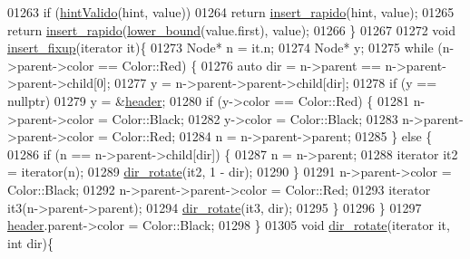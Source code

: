 \begin{DoxyCode}
01263         \textcolor{keywordflow}{if} (\hyperlink{classaed2_1_1map_a45b04533e9acf27438813ab4a2604443_a45b04533e9acf27438813ab4a2604443}{hintValido}(hint, value))
01264             \textcolor{keywordflow}{return} \hyperlink{classaed2_1_1map_a4b4f1e65ee9aeccee4046d53fd5fd8a4_a4b4f1e65ee9aeccee4046d53fd5fd8a4}{insert_rapido}(hint, value);
01265         \textcolor{keywordflow}{return} \hyperlink{classaed2_1_1map_a4b4f1e65ee9aeccee4046d53fd5fd8a4_a4b4f1e65ee9aeccee4046d53fd5fd8a4}{insert_rapido}(\hyperlink{classaed2_1_1map_a3399d36fdd5a880b494f3a5795d3f18f_a3399d36fdd5a880b494f3a5795d3f18f}{lower_bound}(value.first), value);
01266     \}
01267 
01272     \textcolor{keywordtype}{void} \hyperlink{classaed2_1_1map_ac9197851fe5b217d45d58bbaf3612c75_ac9197851fe5b217d45d58bbaf3612c75}{insert_fixup}(iterator it)\{
01273         Node* n = it.n;
01274         Node* y;
01275         \textcolor{keywordflow}{while} (n->parent->color == Color::Red) \{
01276             \textcolor{keyword}{auto} dir = n->parent == n->parent->parent->child[0];
01277             y = n->parent->parent->child[dir];
01278             \textcolor{keywordflow}{if} (y == \textcolor{keyword}{nullptr})
01279                 y = &\hyperlink{classaed2_1_1map_a92d93f905c8ad73fba18fdc7e8915cce_a92d93f905c8ad73fba18fdc7e8915cce}{header};
01280             \textcolor{keywordflow}{if} (y->color == Color::Red) \{
01281                 n->parent->color = Color::Black;
01282                 y->color = Color::Black;
01283                 n->parent->parent->color = Color::Red;
01284                 n = n->parent->parent;
01285             \} \textcolor{keywordflow}{else} \{
01286                 \textcolor{keywordflow}{if} (n == n->parent->child[dir]) \{
01287                     n = n->parent;
01288                     iterator it2 = iterator(n);
01289                     \hyperlink{classaed2_1_1map_a94f2862ada0c9ed4f4457eac42ea8f23_a94f2862ada0c9ed4f4457eac42ea8f23}{dir_rotate}(it2, 1 - dir);
01290                 \}
01291                     n->parent->color = Color::Black;
01292                     n->parent->parent->color = Color::Red;
01293                     iterator it3(n->parent->parent);
01294                     \hyperlink{classaed2_1_1map_a94f2862ada0c9ed4f4457eac42ea8f23_a94f2862ada0c9ed4f4457eac42ea8f23}{dir_rotate}(it3, dir);
01295             \}
01296         \}
01297         \hyperlink{classaed2_1_1map_a92d93f905c8ad73fba18fdc7e8915cce_a92d93f905c8ad73fba18fdc7e8915cce}{header}.parent->color = Color::Black;
01298     \}
01305     \textcolor{keywordtype}{void} \hyperlink{classaed2_1_1map_a94f2862ada0c9ed4f4457eac42ea8f23_a94f2862ada0c9ed4f4457eac42ea8f23}{dir_rotate}(iterator it, \textcolor{keywordtype}{int} dir)\{

\end{DoxyCode}
